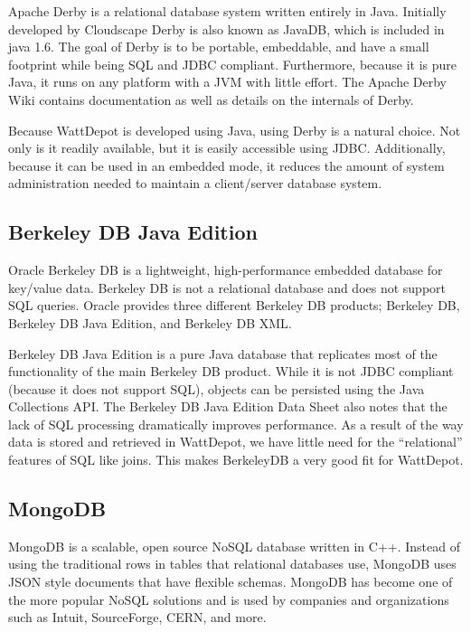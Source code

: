 \documentclass{sig-alternate}
\begin{document}
Apache Derby is a relational database system written entirely in Java.  Initially developed by Cloudscape Derby is also known as JavaDB, which is included in java 1.6.  The goal of Derby is to be portable, embeddable, and have a small footprint while being SQL and JDBC compliant.  Furthermore, because it is pure Java, it runs on any platform with a JVM with little effort.  The Apache Derby Wiki\cite{derby-wiki} contains documentation as well as details on the internals of Derby.

Because WattDepot is developed using Java, using Derby is a natural choice.  Not only is it readily available, but it is easily accessible using JDBC.  Additionally, because it can be used in an embedded mode, it reduces the amount of system administration needed to maintain a client/server database system.

\subsection{Berkeley DB Java Edition}
\label{sub:Berkeley DB Java Edition}

Oracle Berkeley DB is a lightweight, high-performance embedded database for key/value data.  Berkeley DB is not a relational database\cite{berkeley-isnt} and does not support SQL queries. Oracle provides three different Berkeley DB products; Berkeley DB, Berkeley DB Java Edition, and Berkeley DB XML.

Berkeley DB Java Edition is a pure Java database that replicates most of the functionality of the main Berkeley DB product.  While it is not JDBC compliant (because it does not support SQL), objects can be persisted using the Java Collections API.  The Berkeley DB Java Edition Data Sheet\cite{berkeleydb-datasheet} also notes that the lack of SQL processing dramatically improves performance.  As a result of the way data is stored and retrieved in WattDepot, we have little need for the ``relational'' features of SQL like joins.  This makes BerkeleyDB a very good fit for WattDepot.

\subsection{MongoDB}
\label{sub:mongodb}

MongoDB\cite{mongodb} is a scalable, open source NoSQL database written in C++.  Instead of using the traditional rows in tables that relational databases use, MongoDB uses JSON style documents that have flexible schemas.  MongoDB has become one of the more popular NoSQL solutions and is used by companies and organizations such as Intuit, SourceForge, CERN, and more\cite{mongodb-deployments}.
\end{document}
